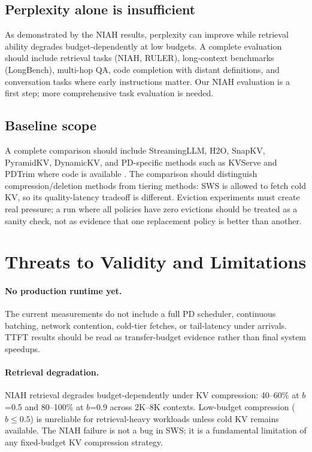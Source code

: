 \documentclass[11pt]{article}
\newcommand{\method}{SWS}
\newcommand{\sws}{SWS}
\newcommand{\pct}{\%}
\theoremstyle{definition}
\theoremstyle{plain}
\begin{document}
\subsection{Perplexity alone is insufficient}
As demonstrated by the NIAH results, perplexity can improve while retrieval ability degrades budget-dependently at low budgets.  A complete evaluation should include retrieval tasks (NIAH, RULER), long-context benchmarks (LongBench), multi-hop QA, code completion with distant definitions, and conversation tasks where early instructions matter.  Our NIAH evaluation is a first step; more comprehensive task evaluation is needed.

\subsection{Baseline scope}
A complete comparison should include StreamingLLM, H2O, SnapKV, PyramidKV, DynamicKV, and PD-specific methods such as KVServe and PDTrim where code is available \citep{streamingllm,h2o,snapkv,pyramidkv,dynamickv,kvserve,pdtrim}.  The comparison should distinguish compression/deletion methods from tiering methods: \method{} is allowed to fetch cold KV, so its quality-latency tradeoff is different.  Eviction experiments must create real pressure; a run where all policies have zero evictions should be treated as a sanity check, not as evidence that one replacement policy is better than another.

\section{Threats to Validity and Limitations}
\label{sec:limitations}

\paragraph{No production runtime yet.}
The current measurements do not include a full PD scheduler, continuous batching, network contention, cold-tier fetches, or tail-latency under arrivals.  TTFT results should be read as transfer-budget evidence rather than final system speedups.

\paragraph{Retrieval degradation.}
NIAH retrieval degrades budget-dependently under KV compression: 40--60\pct{} at $b$=0.5 and 80--100\pct{} at $b$=0.9 across 2K--8K contexts.  Low-budget compression ($b \leq 0.5$) is unreliable for retrieval-heavy workloads unless cold KV remains available.  The NIAH failure is not a bug in \sws{}; it is a fundamental limitation of any fixed-budget KV compression strategy.
\end{document}
